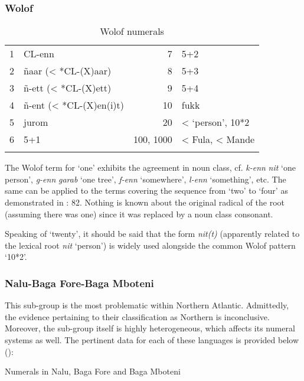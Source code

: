 {\subsubsection{Wolof}%
\begin{table}
\caption{\label{tab:3:227}Wolof numerals}


\begin{tabularx}{\textwidth}{lQrQ}
\lsptoprule

1 & CL-enn & 7 & 5+2\\
2 & ñaar (< *CL-(X)aar) & 8 & 5+3\\
3 & ñ-ett (< *CL-(X)ett) & 9 & 5+4\\
4 & ñ-ent (< *CL-(X)en(i)t) & 10 & fukk\\
5 & jurom & 20 & < `person', 10*2\\
6 & 5+1 & 100, 1000 & < Fula, < Mande\\
\lspbottomrule
\end{tabularx}
\end{table}

The Wolof term for ‘one’ exhibits the agreement in noun class, cf. \textit{k-enn} \textit{nit} ‘one person’, \textit{g-enn} \textit{garab} ‘one tree’, \textit{f-enn} ‘somewhere’, \textit{l-enn} ‘something’, etc. The same can be applied to the terms covering the sequence from ‘two’ to ‘four’ as demonstrated in \citealt{Pozdniakov2015}: 82. Nothing is known about the original radical of the root (assuming there was one) since it was replaced by a noun class consonant.

Speaking of ‘twenty’, it should be said that the form \textit{nit(t)} (apparently related to the lexical root \textit{nit} ‘person’) is widely used alongside the common Wolof pattern ‘10*2’. 

\subsubsection{Nalu-Baga Fore-Baga Mboteni}%
This sub-group is the most problematic within Northern Atlantic. Admittedly, the evidence pertaining to their classification as Northern is inconclusive. Moreover, the sub-group itself is highly heterogeneous, which affects its numeral systems as well. The pertinent data for each of these languages is provided below ():

\begin{table}
\caption{\label{tab:3:228}Numerals in Nalu, Baga Fore and Baga Mboteni}



\end{table}}
